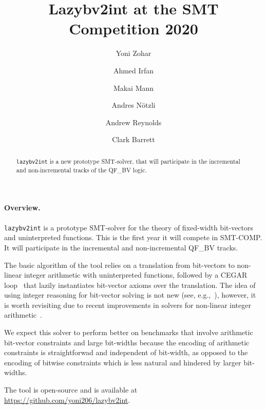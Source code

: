 \documentclass{easychair}
\newcommand{\lazybvtoint}{\texttt{lazybv2int}\xspace}
\newcommand{\smtcomp}{SMT-COMP\xspace}
\newcommand{\qfbv}{QF\_BV\xspace}
\begin{document}
\author{
		Yoni Zohar\and
		Ahmed Irfan \and
		Makai Mann \and
		Andres N\"otzli \and
		Andrew Reynolds\and
		Clark Barrett
}

\title{Lazybv2int at the SMT Competition 2020}

\maketitle


\noindent
\begin{abstract}
\noindent \lazybvtoint is a new prototype SMT-solver, that will participate in
the incremental and non-incremental tracks of the \qfbv logic.
\end{abstract}

\paragraph{Overview.}
\lazybvtoint is a prototype SMT-solver for the theory of fixed-width bit-vectors
and uninterpreted functions. This is the first year it will compete in \smtcomp.
It will participate in the incremental and non-incremental \qfbv tracks.

The basic algorithm of the tool relies on a translation from bit-vectors to
non-linear integer arithmetic with uninterpreted functions, followed by a CEGAR
loop~\cite{cegar} that lazily instantiates bit-vector axioms over the
translation. The idea of using integer reasoning for bit-vector solving is not
new (see,
e.g.,~\cite{DBLP:journals/entcs/BozzanoBCFHKPS06,DBLP:conf/fmcad/BackemanRZ18}),
however, it is worth revisiting due to recent improvements in solvers for
non-linear integer arithmetic~\cite{DBLP:conf/vmcai/Jovanovic17,
  DBLP:conf/sat/CimattiGIRS18}.

We expect this solver to perform better on benchmarks that involve arithmetic
bit-vector constraints and large bit-widths because the encoding of arithmetic
constraints is straightforwad and independent of bit-width, as opposed to the
encoding of bitwise constraints which is less natural and hindered by larger
bit-widths.

The tool is open-source and is available at \url{https://github.com/yoni206/lazybv2int}.
\end{document}
